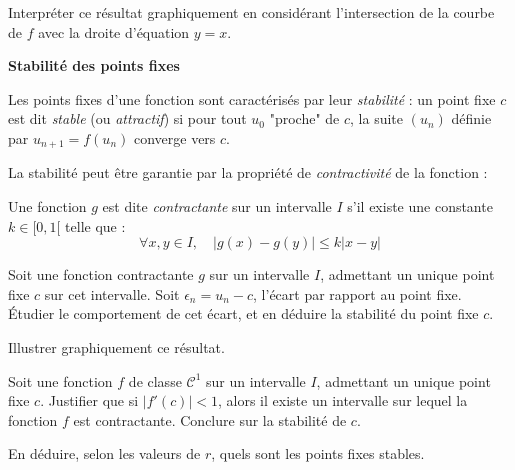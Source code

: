 \documentclass[10pt,a4paper]{article}
\begin{document}
\q Interpréter ce résultat graphiquement en considérant l'intersection de la courbe de \( f \) avec
la droite d'équation \( y = x \).

\vspace{0.5cm}
\textbf{Stabilité des points fixes}

Les points fixes d'une fonction sont caractérisés par leur \textit{stabilité} : un point fixe \( c \) est dit
\textit{stable} (ou \textit{attractif}) si pour tout \( u_0 \) "proche" de \( c \), la suite \(
(u_n) \) définie par \( u_{n+1} = f(u_n) \) converge vers \( c \).

La stabilité peut être garantie par la propriété de \textit{contractivité} de la fonction :

Une fonction \( g \) est dite \textit{contractante} sur un intervalle \( I \) s'il existe une
constante \( k \in [0,1[ \) telle que :
\[
\forall x, y \in I, \quad |g(x) - g(y)| \leq k |x - y|
\]

\q Soit une fonction contractante \( g \) sur un intervalle \( I \), admettant un unique point fixe
\( c \) sur cet intervalle. Soit \( \epsilon_n = u_n - c \), l'écart par rapport au point fixe.
Étudier le comportement de cet écart, et en déduire la stabilité du point fixe \( c \).

\q Illustrer graphiquement ce résultat.

\q Soit une fonction \( f \) de classe \( \mathcal{C}^1 \) sur un
intervalle \( I \), admettant un unique point fixe \( c \). Justifier que si \( |f'(c)| < 1 \),
alors il existe un intervalle sur lequel la fonction \( f \) est contractante. Conclure sur la
stabilité de \( c \).

\q En déduire, selon les valeurs de \( r \), quels sont les points fixes stables.


\end{document}
